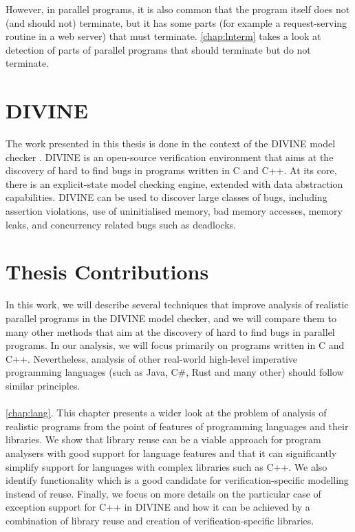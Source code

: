 However, in parallel programs, it is also common that the program itself does
not (and should not) terminate, but it has some parts (for example a
request-serving routine in a web server) that must terminate.
\autoref{chap:lnterm} takes a look at detection of parts of parallel programs that should terminate but do not terminate.

\section{DIVINE}

The work presented in this thesis is done in the context of the DIVINE model checker .
DIVINE is an open-source verification environment that aims at the discovery of hard to find bugs in programs written in C and C++.
At its core, there is an explicit-state model checking engine, extended with data abstraction capabilities.
DIVINE can be used to discover large classes of bugs, including assertion violations, use of uninitialised memory, bad memory accesses, memory leaks, and concurrency related bugs such as deadlocks.


\section{Thesis Contributions}

In this work, we will describe several techniques that improve analysis of realistic parallel programs in the DIVINE model checker, and we will compare them to many other methods that aim at the discovery of hard to find bugs in parallel programs.
In our analysis, we will focus primarily on programs written in C and C++.
Nevertheless, analysis of other real-world high-level imperative programming
languages (such as Java, C\#, Rust and many other) should follow similar
principles.

\paragraph{}
\autoref{chap:lang}.
This chapter presents a wider look at the problem of analysis of realistic
programs from the point of features of programming languages and their libraries.
We show that library reuse can be a viable approach for program analysers with
good support for language features and that it can significantly simplify
support for languages with complex libraries such as C++.
We also identify functionality which is a good candidate for
verification-specific modelling instead of reuse.
Finally, we focus on more details on the particular case of exception support
for C++ in DIVINE and how it can be achieved by a combination of library reuse
and creation of verification-specific libraries.


